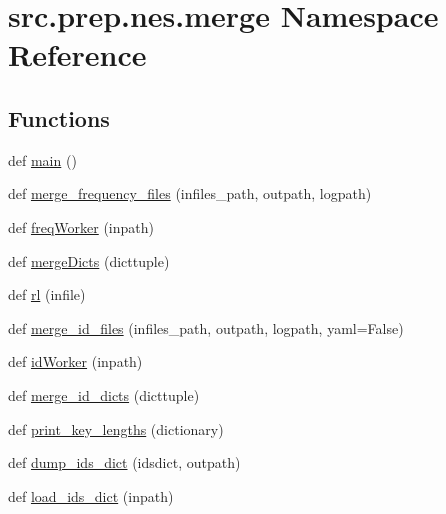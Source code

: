 \hypertarget{namespacesrc_1_1prep_1_1nes_1_1merge}{}\section{src.\+prep.\+nes.\+merge Namespace Reference}
\label{namespacesrc_1_1prep_1_1nes_1_1merge}
\subsection*{Functions}
\begin{DoxyCompactItemize}
\item 
def \hyperlink{namespacesrc_1_1prep_1_1nes_1_1merge_a68c40688133a1ee26502f62e5adf63f4}{main} ()
\item 
def \hyperlink{namespacesrc_1_1prep_1_1nes_1_1merge_acacb06f86e0ee54001e46830411a0c77}{merge\+\_\+frequency\+\_\+files} (infiles\+\_\+path, outpath, logpath)
\item 
def \hyperlink{namespacesrc_1_1prep_1_1nes_1_1merge_a8f2d61eb7d2c13beb0dece499307e691}{freq\+Worker} (inpath)
\item 
def \hyperlink{namespacesrc_1_1prep_1_1nes_1_1merge_ad4f045db166326be26cb6dbb31af141e}{merge\+Dicts} (dicttuple)
\item 
def \hyperlink{namespacesrc_1_1prep_1_1nes_1_1merge_a456b7e95fdce9568b9b22ba7d1f72e2c}{rl} (infile)
\item 
def \hyperlink{namespacesrc_1_1prep_1_1nes_1_1merge_a7120a251a914a22563054285b3b8d0ee}{merge\+\_\+id\+\_\+files} (infiles\+\_\+path, outpath, logpath, yaml=False)
\item 
def \hyperlink{namespacesrc_1_1prep_1_1nes_1_1merge_a30e4b4a8bd7955e42ed9132eaedccfd7}{id\+Worker} (inpath)
\item 
def \hyperlink{namespacesrc_1_1prep_1_1nes_1_1merge_ad76dd1d2e2a9b04755558a2e0200faa0}{merge\+\_\+id\+\_\+dicts} (dicttuple)
\item 
def \hyperlink{namespacesrc_1_1prep_1_1nes_1_1merge_a8a362dff193eba70229279abe837b767}{print\+\_\+key\+\_\+lengths} (dictionary)
\item 
def \hyperlink{namespacesrc_1_1prep_1_1nes_1_1merge_a601c297312ed78297492ef6495fe3a43}{dump\+\_\+ids\+\_\+dict} (idsdict, outpath)
\item 
def \hyperlink{namespacesrc_1_1prep_1_1nes_1_1merge_a6ac66a09af894d0be48b89b198a9db19}{load\+\_\+ids\+\_\+dict} (inpath)
\end{DoxyCompactItemize}


